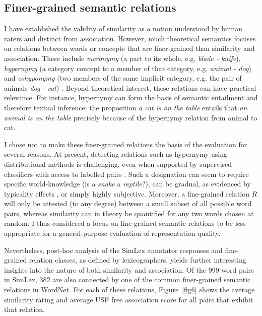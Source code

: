 \subsection{Finer-grained semantic relations}

I have established the validity of similarity as a notion understood by human raters and distinct from association. However, much theoretical semantics focuses on relations between words or concepts that are finer-grained than similarity and association. These include \emph{meronymy} (a part to its whole, e.g. \emph{blade - knife}), \emph{hypernymy} (a category concept to a member of that category, e.g. \emph{animal - dog}) and \emph{cohyponymy} (two members of the same implicit category, e.g. the pair of animals \emph{dog - cat}) \citep{cruse1986lexical}. Beyond theoretical interest, these relations can have practical relevance. For instance, hypernymy can form the basis of semantic entailment and therefore textual inference: the proposition \emph{a cat is on the table} entails that \emph{an animal is on the table} precisely because of the hypernymy relation from animal to cat. 

I chose not to make these finer-grained relations the basis of the evaluation for several reasons. At present, detecting relations such as hypernymy using distributional methods is challenging, even when supported by supervised classifiers with access to labelled pairs \citep{levy2015supervised}. Such a designation can seem to require specific world-knowledge (is a \emph{snake} a \emph{reptile}?), can be gradual, as evidenced by typicality effects \citep{rosch1976structural}, or simply highly subjective. Moreover, a fine-grained relation \(R\) will only be attested (to any degree) between a small subset of all possible word pairs, whereas similarity can in theory be quantified for any two words chosen at random. I thus considered a focus on fine-grained semantic relations to be less appropriate for a general-purpose evaluation of representation quality.  

Nevertheless, post-hoc analysis of the SimLex annotator responses and fine-grained relation classes, as defined by lexicographers, yields further interesting insights into the nature of both similarity and association. Of the 999 word pairs in SimLex, 382 are also connected by one of the common finer-grained semantic relations in WordNet. For each of these relations, Figure~\ref{fig6} shows the average similarity rating and average USF free association score for all pairs that exhibit that relation. 

